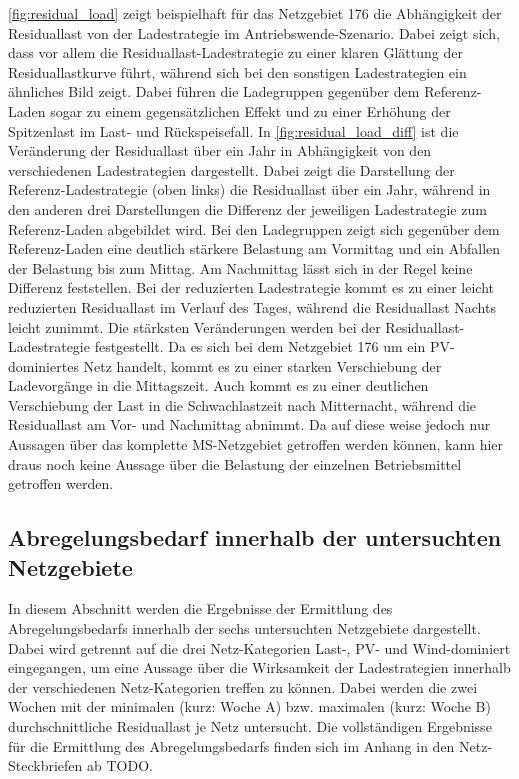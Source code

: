 \autoref{fig:residual_load} zeigt beispielhaft für das Netzgebiet \num{176} die Abhängigkeit der Residuallast von der Ladestrategie im Antriebswende-Szenario.
Dabei zeigt sich, dass vor allem die Residuallast-Ladestrategie zu einer klaren Glättung der Residuallastkurve führt, während sich bei den sonstigen Ladestrategien ein ähnliches Bild zeigt.
Dabei führen die Ladegruppen gegenüber dem Referenz-Laden sogar zu einem gegensätzlichen Effekt und zu einer Erhöhung der Spitzenlast im Last- und Rückspeisefall.
In \autoref{fig:residual_load_diff} ist die Veränderung der Residuallast über ein Jahr in Abhängigkeit von den verschiedenen Ladestrategien dargestellt.
Dabei zeigt die Darstellung der Referenz-Ladestrategie (oben links) die Residuallast über ein Jahr, während in den anderen drei Darstellungen die Differenz der jeweiligen Ladestrategie zum Referenz-Laden abgebildet wird.
Bei den Ladegruppen zeigt sich gegenüber dem Referenz-Laden eine deutlich stärkere Belastung am Vormittag und ein Abfallen der Belastung bis zum Mittag.
Am Nachmittag lässt sich in der Regel keine Differenz feststellen.
Bei der reduzierten Ladestrategie kommt es zu einer leicht reduzierten Residuallast im Verlauf des Tages, während die Residuallast Nachts leicht zunimmt.
Die stärksten Veränderungen werden bei der Residuallast-Ladestrategie festgestellt.
Da es sich bei dem Netzgebiet \num{176} um ein \gls{PV}-dominiertes Netz handelt, kommt es zu einer starken Verschiebung der Ladevorgänge in die Mittagszeit.
Auch kommt es zu einer deutlichen Verschiebung der Last in die Schwachlastzeit nach Mitternacht, während die Residuallast am Vor- und Nachmittag abnimmt.
Da auf diese weise jedoch nur Aussagen über das komplette \gls{MS}-Netzgebiet getroffen werden können, kann hier draus noch keine Aussage über die Belastung der einzelnen Betriebsmittel getroffen werden.





\subsection{Abregelungsbedarf innerhalb der untersuchten Netzgebiete}

In diesem Abschnitt werden die Ergebnisse der Ermittlung des Abregelungsbedarfs innerhalb der sechs untersuchten Netzgebiete dargestellt.
Dabei wird getrennt auf die drei Netz-Kategorien Last-, \gls{PV}- und Wind-dominiert eingegangen, um eine Aussage über die Wirksamkeit der Ladestrategien innerhalb der verschiedenen Netz-Kategorien treffen zu können.
Dabei werden die zwei Wochen mit der minimalen (kurz: Woche A) bzw. maximalen (kurz: Woche B) durchschnittliche Residuallast je Netz untersucht.
Die vollständigen Ergebnisse für die Ermittlung des Abregelungsbedarfs finden sich im Anhang in den Netz-Steckbriefen ab {\color{red} TODO}.


